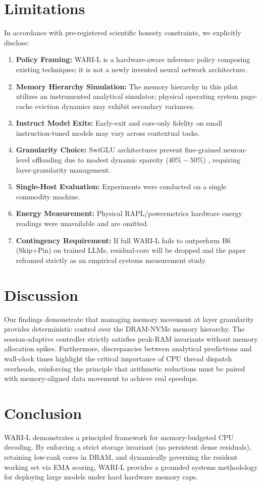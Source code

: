 \documentclass[11pt,a4paper]{article}
\begin{document}
\section{Limitations}
In accordance with pre-registered scientific honesty constraints, we explicitly disclose:
\begin{enumerate}
    \item \textbf{Policy Framing:} WARI-L is a hardware-aware inference policy composing existing techniques; it is not a newly invented neural network architecture.
    \item \textbf{Memory Hierarchy Simulation:} The memory hierarchy in this pilot utilizes an instrumented analytical simulator; physical operating system page-cache eviction dynamics may exhibit secondary variances.
    \item \textbf{Instruct Model Exits:} Early-exit and core-only fidelity on small instruction-tuned models may vary across contextual tasks.
    \item \textbf{Granularity Choice:} SwiGLU architectures prevent fine-grained neuron-level offloading due to modest dynamic sparsity ($40\%-50\%$) \cite{song2024powerinfer}, requiring layer-granularity management.
    \item \textbf{Single-Host Evaluation:} Experiments were conducted on a single commodity machine.
    \item \textbf{Energy Measurement:} Physical RAPL/powermetrics hardware energy readings were unavailable and are omitted.
    \item \textbf{Contingency Requirement:} If full WARI-L fails to outperform B6 (Skip+Pin) on trained LLMs, residual-core will be dropped and the paper reframed strictly as an empirical systems measurement study.
\end{enumerate}

\section{Discussion}
Our findings demonstrate that managing memory movement at layer granularity provides deterministic control over the DRAM-NVMe memory hierarchy. The session-adaptive controller strictly satisfies peak-RAM invariants without memory allocation spikes. Furthermore, discrepancies between analytical predictions and wall-clock times highlight the critical importance of CPU thread dispatch overheads, reinforcing the principle that arithmetic reductions must be paired with memory-aligned data movement to achieve real speedups.

\section{Conclusion}
WARI-L demonstrates a principled framework for memory-budgeted CPU decoding. By enforcing a strict storage invariant (no persistent dense residuals), retaining low-rank cores in DRAM, and dynamically governing the resident working set via EMA scoring, WARI-L provides a grounded systems methodology for deploying large models under hard hardware memory caps.



\end{document}
